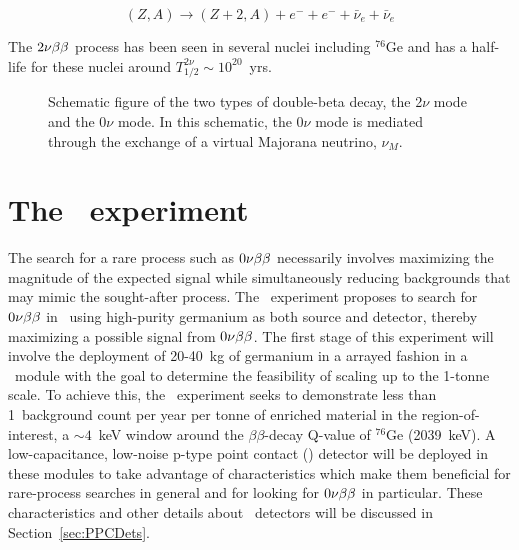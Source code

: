 \begin{equation}
(Z,A) \rightarrow (Z+2,A) + e^- + e^- + \bar{\nu}_e + \bar{\nu}_e
\end{equation}

The $2 \nu \beta \beta$ process has been seen in several nuclei including $^{76}$Ge and has
a half-life for these nuclei around $T^{2\nu}_{1/2}\sim10^{20}$~yrs.  

		\begin{figure}
			\centering
			\def\figheight{0.4\textheight}
		\caption{Schematic figure of the two types of double-beta decay, the 2$\nu$ mode and the 0$\nu$ mode.  
			In this schematic, the 0$\nu$ mode is mediated through the exchange of a virtual Majorana neutrino, $\nu_{M}$.}
		\label{fig:DBDK}
		\end{figure}
 

	
	\section{The \MJ\ experiment}
	
The search for a rare process such as $0 \nu \beta \beta$ necessarily involves maximizing the magnitude of the expected signal while
simultaneously reducing backgrounds that may mimic the sought-after process.  
The \MJ~experiment proposes to search for $0 \nu \beta \beta$ in \gersevensix~using high-purity
germanium as both source and detector, thereby maximizing a possible signal from $0 \nu \beta \beta$. 
The first stage of this experiment will involve the deployment of 20-40~kg of germanium in a arrayed fashion in a \minmod~module with the goal to determine
the feasibility of scaling up to the 1-tonne scale.  To achieve this, the \MJ~experiment seeks to demonstrate less than
1~background count per year per tonne of enriched material in the
region-of-interest, a $\sim4$~keV window around the $\beta\beta$-decay
Q-value of $^{76}$Ge (2039~keV).  A low-capacitance, low-noise p-type point contact (\ppc)
detector will be deployed in these modules to take advantage of characteristics which make 
them beneficial for rare-process searches in general and for looking for $0 \nu \beta \beta$ in particular.  These characteristics and other details about \ppc~detectors will be discussed in Section~\ref{sec:PPCDets}.  

